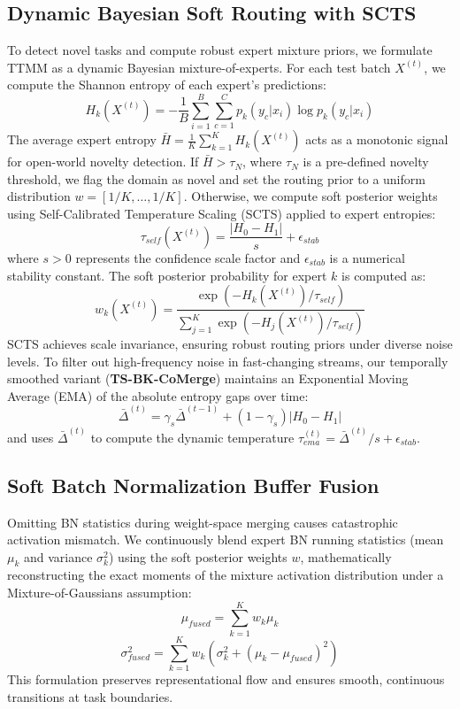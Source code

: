 \documentclass{article}
\theoremstyle{plain}
\theoremstyle{definition}
\theoremstyle{remark}
\begin{document}
\subsection{Dynamic Bayesian Soft Routing with SCTS}
To detect novel tasks and compute robust expert mixture priors, we formulate TTMM as a dynamic Bayesian mixture-of-experts. For each test batch $X^{(t)}$, we compute the Shannon entropy of each expert's predictions:
\begin{equation}
    H_k(X^{(t)}) = -\frac{1}{B}\sum_{i=1}^B \sum_{c=1}^C p_k(y_c|x_i)\log p_k(y_c|x_i)
\end{equation}
The average expert entropy $\bar{H} = \frac{1}{K}\sum_{k=1}^K H_k(X^{(t)})$ acts as a monotonic signal for open-world novelty detection. If $\bar{H} > \tau_N$, where $\tau_N$ is a pre-defined novelty threshold, we flag the domain as novel and set the routing prior to a uniform distribution $w = [1/K, \dots, 1/K]$. Otherwise, we compute soft posterior weights using Self-Calibrated Temperature Scaling (SCTS) applied to expert entropies:
\begin{equation}
    \tau_{self}(X^{(t)}) = \frac{|H_0 - H_1|}{s} + \epsilon_{stab}
\end{equation}
where $s > 0$ represents the confidence scale factor and $\epsilon_{stab}$ is a numerical stability constant. The soft posterior probability for expert $k$ is computed as:
\begin{equation}
    w_k(X^{(t)}) = \frac{\exp(-H_k(X^{(t)})/\tau_{self})}{\sum_{j=1}^K \exp(-H_j(X^{(t)})/\tau_{self})}
\end{equation}
SCTS achieves scale invariance, ensuring robust routing priors under diverse noise levels. To filter out high-frequency noise in fast-changing streams, our temporally smoothed variant (\textbf{TS-BK-CoMerge}) maintains an Exponential Moving Average (EMA) of the absolute entropy gaps over time:
\begin{equation}
    \bar{\Delta}^{(t)} = \gamma_s \bar{\Delta}^{(t-1)} + (1 - \gamma_s)|H_0 - H_1|
\end{equation}
and uses $\bar{\Delta}^{(t)}$ to compute the dynamic temperature $\tau_{ema}^{(t)} = \bar{\Delta}^{(t)}/s + \epsilon_{stab}$.

\subsection{Soft Batch Normalization Buffer Fusion}
Omitting BN statistics during weight-space merging causes catastrophic activation mismatch. We continuously blend expert BN running statistics (mean $\mu_k$ and variance $\sigma_k^2$) using the soft posterior weights $w$, mathematically reconstructing the exact moments of the mixture activation distribution under a Mixture-of-Gaussians assumption:
\begin{equation}
    \mu_{fused} = \sum_{k=1}^K w_k \mu_k
\end{equation}
\begin{equation}
    \sigma_{fused}^2 = \sum_{k=1}^K w_k \left(\sigma_k^2 + (\mu_k - \mu_{fused})^2\right)
\end{equation}
This formulation preserves representational flow and ensures smooth, continuous transitions at task boundaries.
\end{document}

